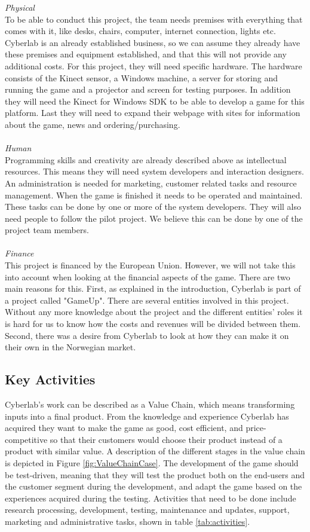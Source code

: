 \emph{Physical} \\ To be able to conduct this project, the team needs premises with everything that comes with it, like desks, chairs, computer, internet connection, lights etc. Cyberlab is an already established business, so we can assume they already have these premises and equipment established, and that this will not provide any additional costs. For this project, they will need specific hardware. The hardware consists of the Kinect sensor, a Windows machine, a server for storing and running the game and a projector and screen for testing purposes. In addition they will need the Kinect for Windows SDK to be able to develop a game for this platform. Last they will need to expand their webpage with sites for information about the game, news and ordering/purchasing. \\ \\
\emph{Human} \\ Programming skills and creativity are already described above as intellectual resources. This means they will need system developers and interaction designers. An administration is needed for marketing, customer related tasks and resource management. When the game is finished it needs to be operated and maintained. These tasks can be done by one or more of the system developers. They will also need people to follow the pilot project. We believe this can be done by one of the project team members. \\ \\
\emph{Finance} \\ This project is financed by the European Union. However, we will not take this into account when looking at the financial aspects of the game. There are two main reasons for this. First, as explained in the introduction, Cyberlab is part of a project called "GameUp". There are several entities involved in this project. Without any more knowledge about the project and the different entities' roles it is hard for us to know how the costs and revenues will be divided between them. Second, there was a desire from Cyberlab to look at how they can make it on their own in the Norwegian market. 

\subsection{Key Activities}
Cyberlab's work can be described as a Value Chain, which means transforming inputs into a final product. From the knowledge and experience Cyberlab has acquired they want to make the game as good, cost efficient, and price-competitive so that their customers would choose their product instead of a product with similar value. A description of the different stages in the value chain is depicted in Figure \ref{fig:ValueChainCase}. The development of the game should be test-driven, meaning that they will test the product both on the end-users and the customer segment during the development, and adapt the game based on the experiences acquired during the testing. Activities that need to be done include research processing, development, testing, maintenance and updates, support, marketing and administrative tasks, shown in table \ref{tab:activities}. 


